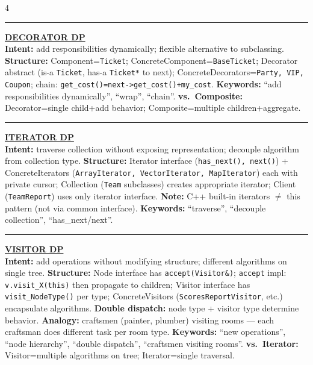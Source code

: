 \documentclass[landscape,letterpaper]{article}
\newcommand{\h}[1]{\textbf{#1}}
\newcommand{\hd}[1]{\vspace{1pt}\noindent\textbf{\underline{#1}}\vspace{-1pt}}
\begin{document}
\begin{multicols}{4}
\vspace{-1pt}\noindent\rule{\columnwidth}{0.2pt}\vspace{-3pt}

\hd{DECORATOR DP}\\[-2pt]
\h{Intent:} add responsibilities dynamically; flexible alternative to subclassing. \h{Structure:} Component=\texttt{Ticket}; ConcreteComponent=\texttt{BaseTicket}; Decorator abstract (is-a \texttt{Ticket}, has-a \texttt{Ticket*} to next); ConcreteDecorators=\texttt{Party, VIP, Coupon}; chain: \texttt{get\_cost()=next->get\_cost()+my\_cost}. \h{Keywords:} ``add responsibilities dynamically'', ``wrap'', ``chain''. \h{vs.\ Composite:} Decorator=single child+add behavior; Composite=multiple children+aggregate.\\[-2pt]

\vspace{-1pt}\noindent\rule{\columnwidth}{0.2pt}\vspace{-3pt}

\hd{ITERATOR DP}\\[-2pt]
\h{Intent:} traverse collection without exposing representation; decouple algorithm from collection type. \h{Structure:} Iterator interface (\texttt{has\_next(), next()}) + ConcreteIterators (\texttt{ArrayIterator, VectorIterator, MapIterator}) each with private cursor; Collection (\texttt{Team} subclasses) creates appropriate iterator; Client (\texttt{TeamReport}) uses only iterator interface. \h{Note:} C++ built-in iterators $\neq$ this pattern (not via common interface). \h{Keywords:} ``traverse'', ``decouple collection'', ``has\_next/next''.\\[-2pt]

\vspace{-1pt}\noindent\rule{\columnwidth}{0.2pt}\vspace{-3pt}

\hd{VISITOR DP}\\[-2pt]
\h{Intent:} add operations without modifying structure; different algorithms on single tree. \h{Structure:} Node interface has \texttt{accept(Visitor\&)}; \texttt{accept} impl: \texttt{v.visit\_X(this)} then propagate to children; Visitor interface has \texttt{visit\_NodeType()} per type; ConcreteVisitors (\texttt{ScoresReportVisitor}, etc.) encapsulate algorithms. \h{Double dispatch:} node type + visitor type determine behavior. \h{Analogy:} craftsmen (painter, plumber) visiting rooms — each craftsman does different task per room type. \h{Keywords:} ``new operations'', ``node hierarchy'', ``double dispatch'', ``craftsmen visiting rooms''. \h{vs.\ Iterator:} Visitor=multiple algorithms on tree; Iterator=single traversal.\\[-2pt]


\end{multicols}
\end{document}
